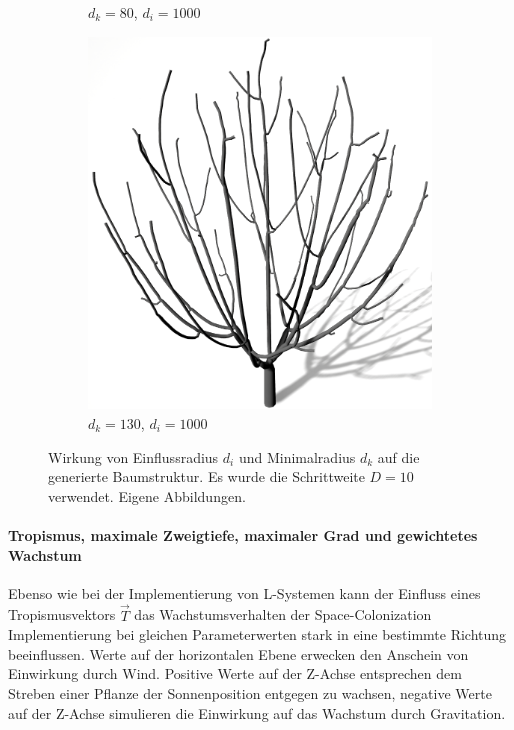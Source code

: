 \begin{figure} [hbtp]
\begin{subfigure}[t]{.45\textwidth}
		\caption{$d_k = 80$, $d_i = 1000$}
		\label{subfig:SCA_KDRI_LowKD_HighRI}
	\end{subfigure}
	\hspace{.05\linewidth}
	\begin{subfigure}[t]{.45\textwidth}
		\centering
		\includegraphics[height=.21\textheight]{images/SCA_KDRI_HighKD_HighRI.png}
		\caption{$d_k = 130$, $d_i = 1000$}
		\label{subfig:SCA_KDRI_HighKD_HighRI}
	\end{subfigure}
	\caption{Wirkung von Einflussradius $d_i$ und Minimalradius $d_k$ auf die generierte Baumstruktur. Es wurde die Schrittweite $D = 10$ verwendet. Eigene Abbildungen.}
	\label{fig:SCA_KDRI}
\end{figure}

\paragraph{Tropismus, maximale Zweigtiefe, maximaler Grad und gewichtetes Wachstum}

Ebenso wie bei der Implementierung von L-Systemen kann der Einfluss eines Tropismusvektors $\overrightarrow{T}$ das Wachstumsverhalten der Space-Colonization Implementierung bei gleichen Parameterwerten stark in eine bestimmte Richtung beeinflussen. Werte auf der horizontalen Ebene erwecken den Anschein von Einwirkung durch Wind. Positive Werte auf der Z-Achse entsprechen dem Streben einer Pflanze der Sonnenposition entgegen zu wachsen, negative Werte auf der Z-Achse simulieren die Einwirkung auf das Wachstum durch Gravitation. \cite[S.5]{SpaceColonizationAlgorithm:07}


